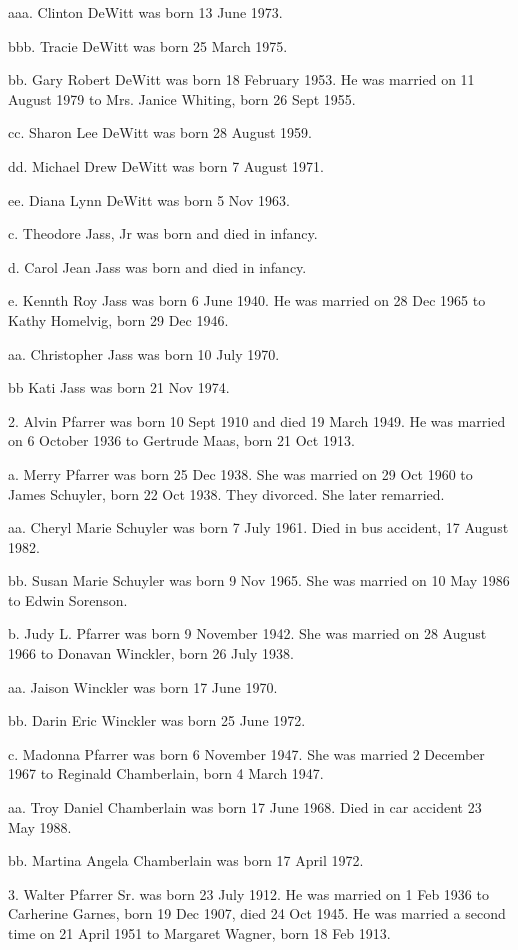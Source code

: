 \documentclass[a4paper]{article}
\begin{document}
aaa. Clinton DeWitt was born 13 June 1973.

bbb. Tracie DeWitt was born 25 March 1975.

bb. Gary Robert DeWitt was born 18 February 1953.  He was married on 11 August 1979 to Mrs. Janice Whiting, born 26 Sept 1955.  

cc. Sharon Lee DeWitt was born 28 August 1959.

dd. Michael Drew DeWitt was born 7 August 1971.

ee. Diana Lynn DeWitt was born 5 Nov 1963.  

c. Theodore Jass, Jr was born and died in infancy.

d. Carol Jean Jass was born and died in infancy.

e. Kennth Roy Jass was born 6 June 1940.  He was married on 28 Dec 1965 to Kathy Homelvig, born 29 Dec 1946.

aa. Christopher Jass was born 10 July 1970.

bb Kati Jass was born 21 Nov 1974.

2. Alvin Pfarrer was born 10 Sept 1910 and died 19 March 1949.  He was married on 6 October 1936 to Gertrude Maas, born 21 Oct 1913.  

a. Merry Pfarrer was born 25 Dec 1938.   She was married on 29 Oct 1960 to James Schuyler, born 22 Oct 1938.  They divorced.  She later remarried.

aa. Cheryl Marie Schuyler was born 7 July 1961.  Died in bus accident, 17 August 1982.

bb. Susan Marie Schuyler was born 9 Nov 1965.  She was married on 10 May 1986 to Edwin Sorenson.

b. Judy L. Pfarrer was born 9 November 1942.  She was married on 28 August 1966 to Donavan Winckler, born 26 July 1938.

aa. Jaison Winckler was born 17 June 1970.

bb. Darin Eric Winckler was born 25 June 1972.

c. Madonna Pfarrer was born 6 November 1947.  She was married 2 December 1967 to Reginald Chamberlain, born 4 March 1947.

aa. Troy Daniel Chamberlain was born 17 June 1968.  Died in car accident 23 May 1988.

bb. Martina Angela Chamberlain was born 17 April 1972.

3. Walter Pfarrer Sr. was born 23 July 1912.  He was married on 1 Feb 1936 to Carherine Garnes, born 19 Dec 1907, died 24 Oct 1945.  He was married a second time on 21 April 1951 to Margaret Wagner, born 18 Feb 1913.
\end{document}
